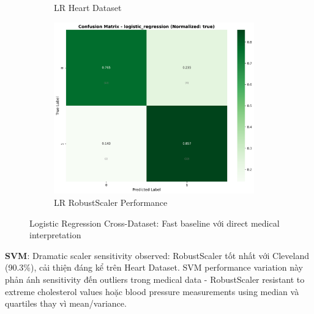 \begin{figure}[H]
\begin{subfigure}[b]{0.31\textwidth}
\caption{LR Heart Dataset}
\label{fig:lr_heart_confusion}
\end{subfigure}
\hfill
\begin{subfigure}[b]{0.31\textwidth}
\centering
\includegraphics[width=0.95\textwidth]{Result/cleveland_dataset/confusion_matrices/logistic_regression_numeric_dataset_RobustScaler.png}
\caption{LR RobustScaler Performance}
\label{fig:lr_baseline_performance}
\end{subfigure}
\caption{Logistic Regression Cross-Dataset: Fast baseline với direct medical interpretation}
\label{fig:logistic_regression_complete}
\end{figure}

\textbf{SVM}: Dramatic scaler sensitivity observed: RobustScaler tốt nhất với Cleveland (90.3\%), cải thiện đáng kể trên Heart Dataset. SVM performance variation này phản ánh sensitivity đến outliers trong medical data - RobustScaler resistant to extreme cholesterol values hoặc blood pressure measurements using median và quartiles thay vì mean/variance.

